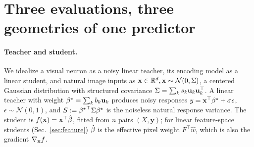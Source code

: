 

\vspace{-15pt}
\section{Three evaluations, three geometries of one predictor}
\label{sec:setup}

\paragraph{Teacher and student.}
We idealize a visual neuron as a noisy linear teacher, its encoding model as a linear student, and natural image inputs as $\mathbf{x}\in\mathbb{R}^d,\mathbf{x}\sim\mathcal N(0,\Sigma)$, a centered Gaussian distribution with structured covariance $\Sigma=\sum_ks_k{\mathbf{u}}_k{\mathbf{u}}_k^\top$.
A linear teacher with weight ${\beta^{\star}}=\sum_kb_k{\mathbf{u}}_k$ produces noisy responses $y=\mathbf{x}^\top{\beta^{\star}}+\sigma\epsilon$, $\epsilon\sim\mathcal{N}(0,1)$, and $S:={{\beta^{\star}}}^\top\Sigma{\beta^{\star}}$ is the noiseless natural response variance.
The student is $f(\mathbf{x})=\mathbf{x}^\top\hat{\beta}$, fitted from $n$ pairs $(X,\mathbf y)$; for linear feature-space students (Sec.~\ref{sec:feature}) $\hat{\beta}$ is the effective pixel weight $F^\top\hat w$, which is also the gradient $\nabla_{\mathbf{x}} f$.

